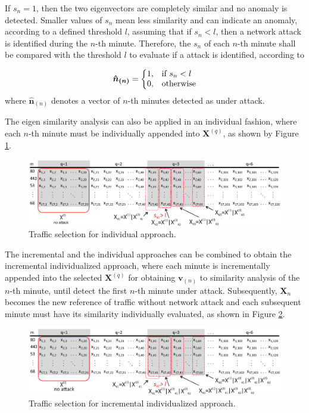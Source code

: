 If $s_n = 1$, then the two eigenvectors are completely similar and no anomaly is detected. Smaller values of $s_n$ mean less similarity and can indicate an anomaly, according to a defined 
threshold $l$, assuming that if $s_n < l$, then a network attack is identified during the $n$-th minute. Therefore, the $s_n$ of each $n$-th minute shall be compared with the threshold $l$ to evaluate if a attack is identified, according to

\begin{equation}\label{eq:eq14}
  \boldsymbol{\hat{n}_{(n)}}=\left\{
  \begin{array}{@{}ll@{}}
    1, & \text{if}\ s_n < l \\
    0, & \text{otherwise}
  \end{array}\right.
\end{equation}
where $\boldsymbol{\hat{n}}_{(n)}$ denotes a vector of $n$-th minutes detected as under attack.

The eigen similarity analysis can also be applied in an individual fashion, where each $n$-th minute must be individually appended into $\boldsymbol{X}^{(q)}$, as shown by Figure \ref{fig:2_fig9}.

\begin{figure}[h!]
     \includegraphics[width=15cm]{figures/individualized.eps}
     \caption{Traffic selection for individual approach.}
     \label{fig:2_fig9}
\end{figure}

The incremental and the individual approaches can be combined to obtain the incremental individualized approach, where each minute is incrementally appended into the selected $\boldsymbol{X}^{(q)}$ for obtaining $\boldsymbol{v}_{(n)}$ to similarity analysis of the $n$-th minute, until detect the first $n$-th minute under attack. Subsequently, $\boldsymbol{X}_n$ becomes the new reference of traffic without network attack and each subsequent minute must have its similarity individually evaluated, as shown in Figure \ref{fig:2_fig2}.

\begin{figure}[h!]
     \includegraphics[width=15cm]{figures/incremental_individualized.eps}
     \caption{Traffic selection for incremental individualized approach.}
     \label{fig:2_fig2}
\end{figure}

